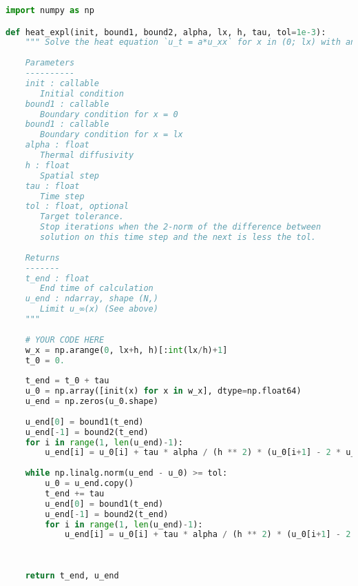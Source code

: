 \begin{lstlisting}[language=Python, caption=Реализация явного метода на языке Python]
import numpy as np

def heat_expl(init, bound1, bound2, alpha, lx, h, tau, tol=1e-3):
    """ Solve the heat equation `u_t = a*u_xx` for x in (0; lx) with an explicit scheme.
    
    Parameters
    ----------
    init : callable
       Initial condition
    bound1 : callable
       Boundary condition for x = 0
    bound1 : callable
       Boundary condition for x = lx
    alpha : float
       Thermal diffusivity
    h : float
       Spatial step
    tau : float
       Time step
    tol : float, optional
       Target tolerance.
       Stop iterations when the 2-norm of the difference between 
       solution on this time step and the next is less the tol.
       
    Returns
    -------
    t_end : float
       End time of calculation
    u_end : ndarray, shape (N,)
       Limit u_∞(x) (See above)
    """
    
    # YOUR CODE HERE
    w_x = np.arange(0, lx+h, h)[:int(lx/h)+1]
    t_0 = 0.
    
    t_end = t_0 + tau
    u_0 = np.array([init(x) for x in w_x], dtype=np.float64)
    u_end = np.zeros(u_0.shape)
    
    u_end[0] = bound1(t_end)
    u_end[-1] = bound2(t_end)
    for i in range(1, len(u_end)-1):
        u_end[i] = u_0[i] + tau * alpha / (h ** 2) * (u_0[i+1] - 2 * u_0[i] + u_0[i-1])
    
    while np.linalg.norm(u_end - u_0) >= tol:
        u_0 = u_end.copy()
        t_end += tau
        u_end[0] = bound1(t_end)
        u_end[-1] = bound2(t_end)
        for i in range(1, len(u_end)-1):
            u_end[i] = u_0[i] + tau * alpha / (h ** 2) * (u_0[i+1] - 2 * u_0[i] + u_0[i-1])
    
    
    
    return t_end, u_end

\end{lstlisting}


